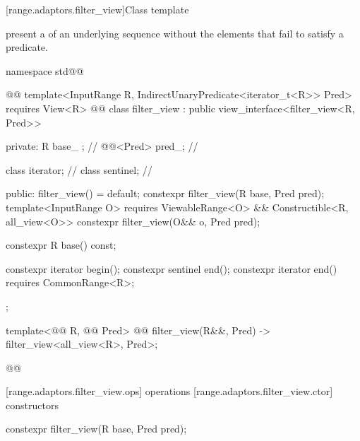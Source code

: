 [range.adaptors.filter_view]{Class template }

\pnum
{}   present a
 of an underlying sequence without the
elements that fail to satisfy a predicate.

\pnum
\begin{example}
\end{example}

\begin{codeblock}
namespace std@@ { @@
  template<InputRange R, IndirectUnaryPredicate<iterator_t<R>> Pred>
    requires View<R> @@
  class filter_view : public view_interface<filter_view<R, Pred>> {
  private:
    R base_ {};                              // \expos
    @@<Pred> pred_; // \expos

    class iterator;                          // \expos
    class sentinel;                          // \expos

  public:
    filter_view() = default;
    constexpr filter_view(R base, Pred pred);
    template<InputRange O>
      requires ViewableRange<O> && Constructible<R, all_view<O>>
    constexpr filter_view(O&& o, Pred pred);

    constexpr R base() const;

    constexpr iterator begin();
    constexpr sentinel end();
    constexpr iterator end() requires CommonRange<R>;
  };

  template<@@ R, @@ Pred>
    @@
  filter_view(R&&, Pred) -> filter_view<all_view<R>, Pred>;
}@\oldtxt{\}}@
\end{codeblock}

[range.adaptors.filter_view.ops]{ operations}
[range.adaptors.filter_view.ctor]{ constructors}

%
\begin{itemdecl}
constexpr filter_view(R base, Pred pred);
\end{itemdecl}

